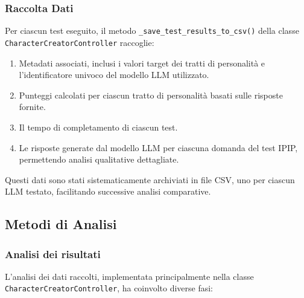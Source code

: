 \subsubsection{Raccolta Dati}

Per ciascun test eseguito, il metodo \texttt{\_save\_test\_results\_to\_csv()} della classe \texttt{CharacterCreatorController} raccoglie:

\begin{enumerate}
    \item
    Metadati associati, inclusi i valori target dei tratti di personalità e l'identificatore univoco del modello LLM utilizzato.
    \item
    Punteggi calcolati per ciascun tratto di personalità basati sulle risposte fornite.
    \item
    Il tempo di completamento di ciascun test.
    \item
    Le risposte generate dal modello LLM per ciascuna domanda del test IPIP, permettendo analisi qualitative dettagliate.
\end{enumerate}
Questi dati sono stati sistematicamente archiviati in file CSV, uno per ciascun LLM testato, facilitando successive analisi comparative.

\subsection{Metodi di Analisi}

\subsubsection{Analisi dei risultati}

L'analisi dei dati raccolti, implementata principalmente nella classe \\
\texttt{CharacterCreatorController}, ha coinvolto diverse fasi:

